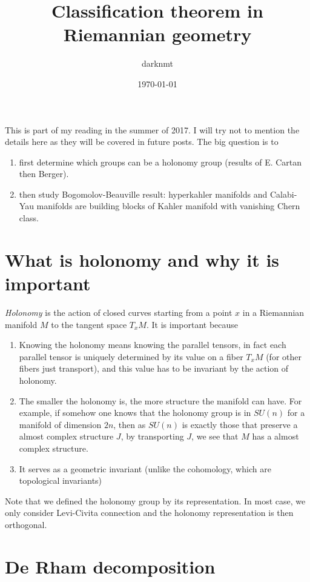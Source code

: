 \documentclass[11pt]{article}
\author{darknmt}
\date{\today}
\title{Classification theorem in Riemannian geometry}
\begin{document}
\maketitle
\tableofcontents

This is part of my reading in the summer of 2017. I will try not to mention the details here as they
will be covered in future posts. The big question is to 
\begin{enumerate}
\item first determine which groups can be a holonomy group (results of E. Cartan then Berger).
\item then study Bogomolov-Beauville result: hyperkahler manifolds and Calabi-Yau manifolds are
building blocks of Kahler manifold with vanishing Chern class.
\end{enumerate}

\section{What is holonomy and why it is important}
\label{sec:org5b05145}

\emph{Holonomy} is the action of closed curves starting from a point \(x\) in a Riemannian manifold \(M\) to
the tangent space \(T_xM\). It is important because

\begin{enumerate}
\item Knowing the holonomy means knowing the parallel tensors, in fact each parallel tensor is uniquely
determined by its value on a fiber \(T_xM\) (for other fibers just transport), and this value has
to be invariant by the action of holonomy.
\item The smaller the holonomy is, the more structure the manifold can have. For example, if somehow
one knows that the holonomy group is in \(SU(n)\) for a manifold of dimension \(2n\), then as \(SU(n)\)
is exactly those that preserve a almost complex structure \(J\), by transporting \(J\), we see that
\(M\) has a almost complex structure.
\item It serves as a geometric invariant (unlike the cohomology, which are topological invariants)
\end{enumerate}


Note that we defined the holonomy group by its representation. In most case, we only consider
Levi-Civita connection and the holonomy representation is then orthogonal.
\section{De Rham decomposition}
\label{sec:orga617747}
\end{document}
